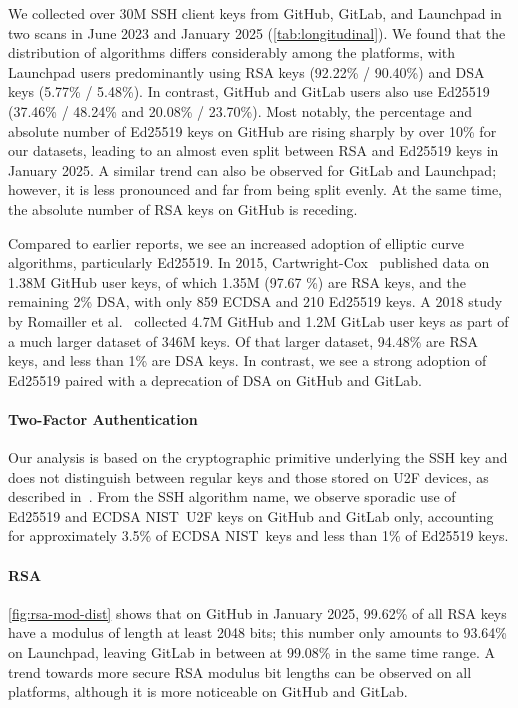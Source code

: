 We collected over 30M SSH client keys from GitHub, GitLab, and Launchpad in two scans in June 2023 and January 2025 (\autoref{tab:longitudinal}). We found that the distribution of algorithms differs considerably among the platforms, with Launchpad users predominantly using RSA keys (92.22\% / 90.40\%) and DSA keys (5.77\% / 5.48\%). In contrast, GitHub and GitLab users also use Ed25519 (37.46\% / 48.24\% and 20.08\% / 23.70\%). Most notably, the percentage and absolute number of Ed25519 keys on GitHub are rising sharply by over 10\% for our datasets, leading to an almost even split between RSA and Ed25519 keys in January 2025. A similar trend can also be observed for GitLab and Launchpad; however, it is less pronounced and far from being split evenly. At the same time, the absolute number of RSA keys on GitHub is receding. 

Compared to earlier reports, we see an increased adoption of elliptic curve algorithms, particularly Ed25519. In 2015, Cartwright-Cox~\cite{cox2015} published data on 1.38M GitHub user keys, of which 1.35M (97.67 \%) are RSA keys, and the remaining 2\% DSA, with only 859 ECDSA and 210 Ed25519 keys. A 2018 study by Romailler et al.~\cite{amiet2018} collected 4.7M GitHub and 1.2M GitLab user keys as part of a much larger dataset of 346M keys. Of that larger dataset, 94.48\% are RSA keys, and less than 1\% are DSA keys. In contrast, we see a strong adoption of Ed25519 paired with a deprecation of DSA on GitHub and GitLab.

\paragraph{Two-Factor Authentication}

Our analysis is based on the cryptographic primitive underlying the SSH key and does not distinguish between regular keys and those stored on U2F devices, as described in~\cite{protocolopensshu2f}. From the SSH algorithm name, we observe sporadic use of Ed25519 and ECDSA NIST~\ptwofivesix U2F keys on GitHub and GitLab only, accounting for approximately 3.5\% of ECDSA NIST~\ptwofivesix keys and less than 1\% of Ed25519 keys.

\paragraph{RSA}

\autoref{fig:rsa-mod-dist} shows that on GitHub in January 2025, 99.62\% of all RSA keys have a modulus of length at least 2048 bits; this number only amounts to 93.64\% on Launchpad, leaving GitLab in between at 99.08\% in the same time range. A trend towards more secure RSA modulus bit lengths can be observed on all platforms, although it is more noticeable on GitHub and GitLab.


